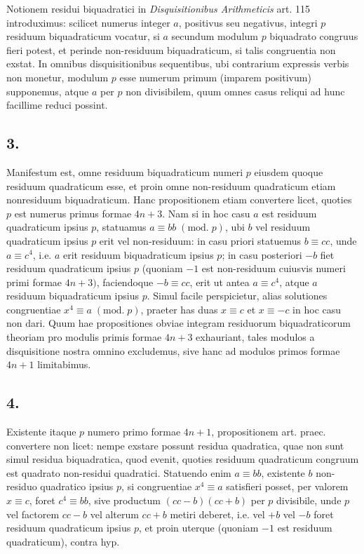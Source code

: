\documentclass[twoside,12pt]{memoir}
\renewcommand{\pmod}[1]{\;(\textrm{mod.}\;#1)}
\begin{document}
Notionem residui biquadratici in \textit{Disquisitionibus Arithmeticis} art. 115 introduximus: scilicet numerus integer \(a\), positivus seu negativus, integri \(p\) residuum biquadraticum vocatur, si \(a\) secundum modulum \(p\) biquadrato congruus fieri potest, et perinde non-residuum biquadraticum, si talis congruentia non exstat. In omnibus disquisitionibus sequentibus, ubi contrarium expressis verbis non monetur, modulum \(p\) esse numerum primum (imparem positivum) supponemus, atque \(a\) per \(p\) non divisibilem, quum omnes casus reliqui ad hunc facillime reduci possint.

\subsection*{3.}
 
Manifestum est, omne residuum biquadraticum numeri \(p\) eiusdem quoque residuum quadraticum esse, et proin omne non-residuum quadraticum etiam nonresiduum biquadraticum. Hanc propositionem etiam convertere licet, quoties \(p\) est numerus primus formae \(4 n+3\). Nam si in hoc casu \(a\) est residuum quadraticum ipsius \(p\), statuamus \(a \equiv b b \pmod{p}\), ubi \(b\) vel residuum quadraticum ipsius \(p\) erit vel non-residuum: in casu priori statuemus \(b \equiv c c\), unde \(a \equiv c^{4}\), i.e. \(a\) erit residuum biquadraticum ipsius \(p\); in casu posteriori \(-b\) fiet residuum quadraticum ipsius \(p\) (quoniam \(-1\) est non-residuum cuiusvis numeri primi formae \(4 n+3)\), faciendoque \(-b \equiv c c\), erit ut antea \(a \equiv c^{4}\), atque \(a\) residuum biquadraticum ipsius \(p\). Simul facile perspicietur, alias solutiones congruentiae \(x^{4} \equiv a\pmod{p}\), praeter has duas \(x \equiv c\) et \(x \equiv-c\) in hoc casu non dari. Quum hae propositiones obviae integram residuorum biquadraticorum theoriam pro modulis primis formae \(4 n+3\) exhauriant, tales modulos a disquisitione nostra omnino excludemus, sive hanc ad modulos primos formae \(4 n+1\) limitabimus.

\subsection*{4.}
 
Existente itaque \(p\) numero primo formae \(4 n+1\), propositionem art. praec. convertere non licet: nempe exstare possunt residua quadratica, quae non sunt simul residua biquadratica, quod evenit, quoties residuum quadraticum congruum est quadrato non-residui quadratici. Statuendo enim \(a \equiv b b\), existente \(b\) non-\pagebreak%
residuo quadratico ipsius \(p\), si congruentiae \(x^{4} \equiv a\) satisfieri posset, per valorem \(x \equiv c\), foret \(c^{4} \equiv b b\), sive productum \((c c-b)(c c+b)\) per \(p\) divisibile, unde \(p\) vel factorem \(c c-b\) vel alterum \(c c+b\) metiri deberet, i.e. vel \(+b\) vel \(-b\) foret residuum quadraticum ipsius \(p\), et proin uterque (quoniam \(-1\) est residuum quadraticum), contra hyp.
 
\end{document}
